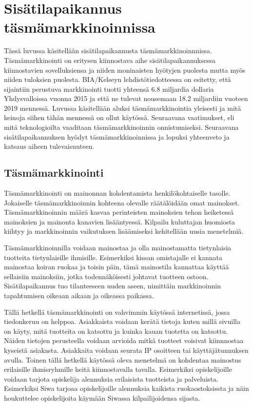 \section{Sisätilapaikannus täsmämarkkinoinnissa}
Tässä luvussa käsitellään sisätilapaikannusta täsmämarkkinoinnnissa. Täsmämarkkinointi on eritysen kiinnostava aihe sisätilapaikannuksessa kiinnostavien sovelluksiensa ja niiden moninaisten hyötyjen puolesta mutta myös niiden tuloksien puolesta. BIA/Kelseyn\cite{press} lehdistötiedotteessa on esitetty, että sijaintiin perustuva markkinointi tuotti yhteensä 6.8 miljardia dollaria Yhdysvalloissa vuonna 2015 ja että ne tulevat nousemaan 18.2 miljardiin vuoteen 2019 mennessä.
Luvussa käsitellään aluksi täsmämarkkinointia yleisesti ja mitä keinoja siihen tähän mennessä on ollut käytössä. Seuraavana vaatimukset, eli mitä teknologioilta vaaditaan täsmämarkkinoinnin onnistumiseksi. Seuraavana sisätilapaikannuksen hyödyt täsmämarkkinoinnissa ja lopuksi yhteenveto ja katsaus aiheen tulevaisuuteen.

\subsection{Täsmämarkkinointi}
Täsmämarkkinointi on mainonnan kohdentamista henkilökohtaiselle tasolle. Jokaiselle täsmämarkkinoinnin kohteena olevalle räätälöidään omat mainokset. Täsmämarkkinoinnin määrä kasvaa perinteisten mainoksien tehon heiketessä mainoksien ja mainonta kanavien lisääntyessä\cite{tasma}. Kilpailu kuluttajan huomiosta kiihtyy ja markkinoinnin vaikutuksen lisäämiseksi kehitellään uusia menetelmiä.

Täsmämarkkinoinnilla voidaan mainostaa ja olla mainostamatta tietynlaisia tuotteita tietynlaisille ihmisille. Esimerkiksi kissan omistajalle ei kannata mainostaa koiran ruokaa ja toisin päin\cite{tasma}, tämä mainostila kannattaa käyttää sellaisiin mainoksiin, jotka todennäköisesti johtavat tuotteen ostoon. Sisätilapaikannus tuo tilanteeseen uuden aseen, nimittäin markkinoinnin tapahtumisen oikeaan aikaan ja oikeassa paikassa.

Tällä hetkellä täsmämarkkinointi on vahvimmin käytössä internetissä, jossa tiedonkeruu on helppoa. Asiakkaista voidaan kerätä tietoja kuten millä sivuilla on käyty, mitä tuotteita on katsottu ja kuinka kauan tuotetta on katsottu. Näiden tietojen perusteella voidaan arvioida mitkä tuotteet voisivat kiinnnostaa kyseistä asiakasta. Asiakkaita voidaan seurata IP osoitteen tai käyttäjätunnuksen avulla.
Toinen tällä hetkellä käytössä oleva menetelmä on kohdentaa mainostus erilaisille ihmisryhmille heitä kiinnostavalla tavalla. Esimerkiksi opiskelijoille voidaan tarjota opiskelija alennuksia erilaisista tuotteista ja palveluista. Esimerkiksi Siwa tarjoaa opiskelijoille alennuksia kaikista ruokaostoksissta\cite{siwa} ja näin houkuttelee opiskelijoita käymään Siwassa kilpailijoidensa sijasta. 


